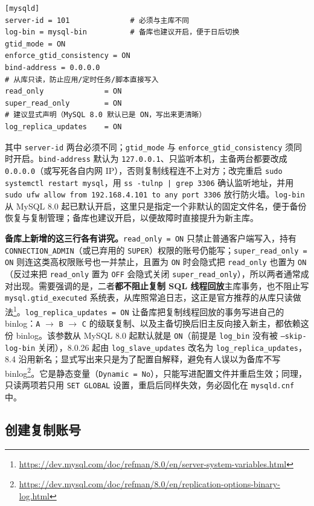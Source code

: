 \documentclass[12pt,UTF8]{ctexbook}
\begin{document}
\begin{lstlisting}
[mysqld]
server-id = 101              # 必须与主库不同
log-bin = mysql-bin          # 备库也建议开启，便于日后切换
gtid_mode = ON
enforce_gtid_consistency = ON
bind-address = 0.0.0.0
# 从库只读，防止应用/定时任务/脚本直接写入
read_only              = ON
super_read_only        = ON
# 建议显式声明（MySQL 8.0 默认已是 ON，写出来更清晰）
log_replica_updates    = ON
\end{lstlisting}

其中 \texttt{server-id} 两台必须不同；\texttt{gtid\_mode} 与 \texttt{enforce\_gtid\_consistency} 须同时开启。\texttt{bind-address} 默认为 \texttt{127.0.0.1}、只监听本机，主备两台都要改成 \texttt{0.0.0.0}（或写死各自内网 IP），否则复制线程连不上对方；改完重启 \texttt{sudo systemctl restart mysql}，用 \texttt{ss -tulnp | grep 3306} 确认监听地址，并用 \texttt{sudo ufw allow from 192.168.4.101 to any port 3306} 放行防火墙。\texttt{log-bin} 从 MySQL 8.0 起已默认开启，这里只是指定一个非默认的固定文件名，便于备份恢复与复制管理；备库也建议开启，以便故障时直接提升为新主库。

\textbf{备库上新增的这三行各有讲究。}\texttt{read\_only = ON} 只禁止普通客户端写入，持有 \texttt{CONNECTION\_ADMIN}（或已弃用的 \texttt{SUPER}）权限的账号仍能写；\texttt{super\_read\_only = ON} 则连这类高权限账号也一并禁止，且置为 \texttt{ON} 时会隐式把 \texttt{read\_only} 也置为 \texttt{ON}（反过来把 \texttt{read\_only} 置为 \texttt{OFF} 会隐式关闭 \texttt{super\_read\_only}），所以两者通常成对出现。需要强调的是，二者\textbf{都不阻止复制 SQL 线程回放}主库事务，也不阻止写 \texttt{mysql.gtid\_executed} 系统表，从库照常追日志，这正是官方推荐的从库只读做法\footnote{\url{https://dev.mysql.com/doc/refman/8.0/en/server-system-variables.html}}。\texttt{log\_replica\_updates = ON} 让备库把复制线程回放的事务写进自己的 binlog：\texttt{A} $\to$ \texttt{B} $\to$ \texttt{C} 的级联复制、以及主备切换后旧主反向接入新主，都依赖这份 binlog。该参数从 MySQL 8.0 起默认就是 \texttt{ON}（前提是 \texttt{log\_bin} 没有被 \texttt{--skip-log-bin} 关闭），8.0.26 起由 \texttt{log\_slave\_updates} 改名为 \texttt{log\_replica\_updates}，8.4 沿用新名；显式写出来只是为了配置自解释，避免有人误以为备库不写 binlog\footnote{\url{https://dev.mysql.com/doc/refman/8.0/en/replication-options-binary-log.html}}。它是静态变量（\texttt{Dynamic = No}），只能写进配置文件并重启生效；同理，只读两项若只用 \texttt{SET GLOBAL} 设置，重启后同样失效，务必固化在 \texttt{mysqld.cnf} 中。

\subsection{创建复制账号}
\end{document}
